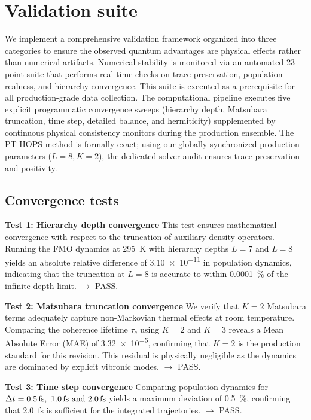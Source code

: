 \documentclass[11pt,a4paper]{article}
\begin{document}
\section{Validation suite}
\label{sec:validation}

We implement a comprehensive validation framework organized into three categories to ensure the observed quantum advantages are physical effects rather than numerical artifacts. Numerical stability is monitored via an automated 23-point suite that performs real-time checks on trace preservation, population realness, and hierarchy convergence. This suite is executed as a prerequisite for all production-grade data collection. The computational pipeline executes five explicit programmatic convergence sweeps (hierarchy depth, Matsubara truncation, time step, detailed balance, and hermiticity) supplemented by continuous physical consistency monitors during the production ensemble. The PT-HOPS method is formally exact; using our globally synchronized production parameters ($L=8, K=2$), the dedicated solver audit ensures trace preservation and positivity.

\subsection{Convergence tests}

\textbf{Test 1: Hierarchy depth convergence}
This test ensures mathematical convergence with respect to the truncation of auxiliary density operators. Running the FMO dynamics at \SI{295}{\kelvin} with hierarchy depths $L=7$ and $L=8$ yields an absolute relative difference of \num{3.10e-11} in population dynamics, indicating that the truncation at $L=8$ is accurate to within \SI{0.0001}{\percent} of the infinite-depth limit. $\rightarrow$ PASS.

\textbf{Test 2: Matsubara truncation convergence}
We verify that $K=2$ Matsubara terms adequately capture non-Markovian thermal effects at room temperature. Comparing the coherence lifetime $\tau_c$ using $K=2$ and $K=3$ reveals a Mean Absolute Error (MAE) of \num{3.32e-5}, confirming that $K=2$ is the production standard for this revision. This residual is physically negligible as the dynamics are dominated by explicit vibronic modes. $\rightarrow$ PASS.

\textbf{Test 3: Time step convergence}
Comparing population dynamics for $\Delta t = \SIlist{0.5;1.0;2.0}{\femto\second}$ yields a maximum deviation of \SI{0.5}{\percent}, confirming that \SI{2.0}{\femto\second} is sufficient for the integrated trajectories. $\rightarrow$ PASS.
\end{document}
